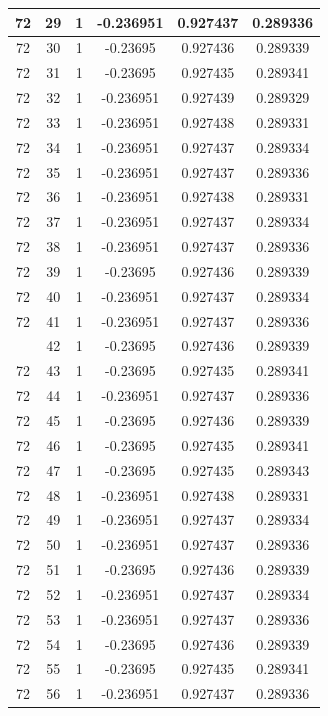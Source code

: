 \documentclass[12pt,a4paper]{article}
\numberwithin{equation}{section}
\numberwithin{figure}{section}
\numberwithin{table}{section}
\begin{document}
\begin{longtable}{|c|c|c|c|c|c|}
72 & 29 & 1 & -0.236951 & 0.927437 & 0.289336 \\ \hline
72 & 30 & 1 & -0.23695 & 0.927436 & 0.289339 \\ \hline
72 & 31 & 1 & -0.23695 & 0.927435 & 0.289341 \\ \hline
72 & 32 & 1 & -0.236951 & 0.927439 & 0.289329 \\ \hline
72 & 33 & 1 & -0.236951 & 0.927438 & 0.289331 \\ \hline
72 & 34 & 1 & -0.236951 & 0.927437 & 0.289334 \\ \hline
72 & 35 & 1 & -0.236951 & 0.927437 & 0.289336 \\ \hline
72 & 36 & 1 & -0.236951 & 0.927438 & 0.289331 \\ \hline
72 & 37 & 1 & -0.236951 & 0.927437 & 0.289334 \\ \hline
72 & 38 & 1 & -0.236951 & 0.927437 & 0.289336 \\ \hline
72 & 39 & 1 & -0.23695 & 0.927436 & 0.289339 \\ \hline
72 & 40 & 1 & -0.236951 & 0.927437 & 0.289334 \\ \hline
72 & 41 & 1 & -0.236951 & 0.927437 & 0.289336 \\ \hline
\pagebreak
72 & 42 & 1 & -0.23695 & 0.927436 & 0.289339 \\ \hline
72 & 43 & 1 & -0.23695 & 0.927435 & 0.289341 \\ \hline
72 & 44 & 1 & -0.236951 & 0.927437 & 0.289336 \\ \hline
72 & 45 & 1 & -0.23695 & 0.927436 & 0.289339 \\ \hline
72 & 46 & 1 & -0.23695 & 0.927435 & 0.289341 \\ \hline
72 & 47 & 1 & -0.23695 & 0.927435 & 0.289343 \\ \hline
72 & 48 & 1 & -0.236951 & 0.927438 & 0.289331 \\ \hline
72 & 49 & 1 & -0.236951 & 0.927437 & 0.289334 \\ \hline
72 & 50 & 1 & -0.236951 & 0.927437 & 0.289336 \\ \hline
72 & 51 & 1 & -0.23695 & 0.927436 & 0.289339 \\ \hline
72 & 52 & 1 & -0.236951 & 0.927437 & 0.289334 \\ \hline
72 & 53 & 1 & -0.236951 & 0.927437 & 0.289336 \\ \hline
72 & 54 & 1 & -0.23695 & 0.927436 & 0.289339 \\ \hline
72 & 55 & 1 & -0.23695 & 0.927435 & 0.289341 \\ \hline
72 & 56 & 1 & -0.236951 & 0.927437 & 0.289336 \\ \hline

\end{longtable}
\end{document}
